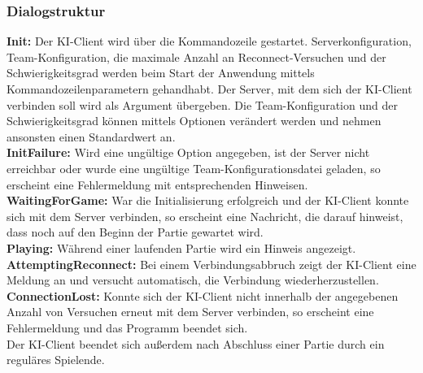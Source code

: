 \subsubsection{Dialogstruktur}  
\textbf{Init:} Der KI-Client wird über die Kommandozeile gestartet. Serverkonfiguration, Team-Konfiguration, die maximale Anzahl an Reconnect-Versuchen und der Schwierigkeitsgrad werden beim Start der Anwendung mittels Kommandozeilenparametern gehandhabt. Der Server, mit dem sich der KI-Client verbinden soll wird als Argument übergeben. Die Team-Konfiguration und der Schwierigkeitsgrad können mittels Optionen verändert werden und nehmen ansonsten einen Standardwert an.\\
\textbf{InitFailure:} Wird eine ungültige Option angegeben, ist der Server nicht erreichbar oder wurde eine ungültige Team-Konfigurationsdatei geladen, so erscheint eine Fehlermeldung mit entsprechenden Hinweisen.\\
\textbf{WaitingForGame:} War die Initialisierung erfolgreich und der KI-Client konnte sich mit dem Server verbinden, so erscheint eine Nachricht, die darauf hinweist, dass noch auf den Beginn der Partie gewartet wird.\\
\textbf{Playing:} Während einer laufenden Partie wird ein Hinweis angezeigt.\\
\textbf{AttemptingReconnect:} Bei einem Verbindungsabbruch zeigt der KI-Client eine Meldung an und versucht automatisch, die Verbindung wiederherzustellen.\\
\textbf{ConnectionLost:} Konnte sich der KI-Client nicht innerhalb der angegebenen Anzahl von Versuchen erneut mit dem Server verbinden, so erscheint eine Fehlermeldung und das Programm beendet sich.\\
Der KI-Client beendet sich außerdem nach Abschluss einer Partie durch ein reguläres Spielende. 

